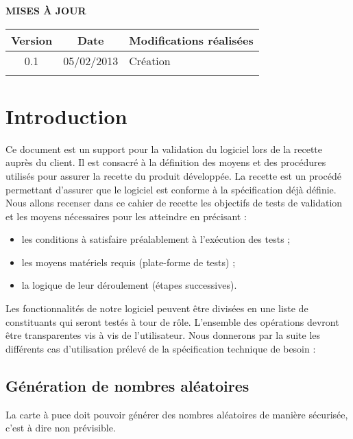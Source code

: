 \documentclass[a4paper,11pt,french]{article}
\begin{document}
\makeFirstPage
\clearpage

\vspace*{1cm}
\begin{center}
\textbf{\huge{MISES À JOUR}}\\
\vspace*{3cm}
\begin{tabularx}{16cm}{|c|c|X|}
\hline
\bfseries{Version} & \bfseries{Date} & \bfseries{Modifications réalisées}\\
\hline
0.1 & 05/02/2013 & Création\\
\hline
&&\\
\hline
\end{tabularx}
\end{center}

\clearpage
\tableofcontents
\clearpage

\section{Introduction}

Ce document est un support pour la validation du logiciel lors de la recette auprès du client.
Il est consacré à la définition des moyens et des procédures utilisés pour assurer la recette du
produit développée. La recette est un procédé permettant d’assurer que le logiciel est conforme à la
spécification déjà définie.
Nous allons recenser dans ce cahier de recette les objectifs de tests de validation et les moyens
nécessaires pour les atteindre en précisant :
\begin{itemize}
	\item les conditions à satisfaire préalablement à l’exécution des tests ;
	\item les moyens matériels requis (plate-forme de tests) ;
	\item la logique de leur déroulement (étapes successives).
\end{itemize}
Les fonctionnalités de notre logiciel peuvent être divisées en une liste de constituants qui seront
testés à tour de rôle. L'ensemble des opérations devront être transparentes vis à vis de l'utilisateur. 
Nous donnerons par la suite les différents cas d’utilisation prélevé de la spécification technique de besoin :

\subsection*{Génération de nombres aléatoires}
La carte à puce doit pouvoir générer des nombres aléatoires de manière sécurisée, c'est à dire non prévisible.
\end{document}
